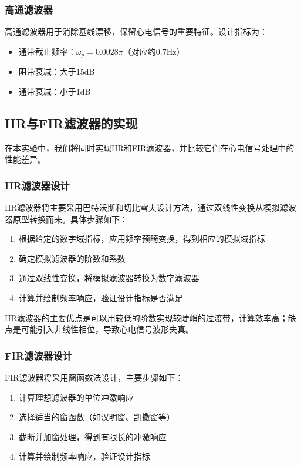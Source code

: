 \documentclass[12pt,hyperref,a4paper,UTF8]{ctexart}
\begin{document}
\subsubsection{高通滤波器}

高通滤波器用于消除基线漂移，保留心电信号的重要特征。设计指标为：
\begin{itemize}
    \item 通带截止频率：\(\omega_p = 0.0028\pi\)（对应约0.7Hz）
    \item 阻带衰减：大于15dB
    \item 通带衰减：小于1dB
\end{itemize}

\subsection{IIR与FIR滤波器的实现}

在本实验中，我们将同时实现IIR和FIR滤波器，并比较它们在心电信号处理中的性能差异。

\subsubsection{IIR滤波器设计}

IIR滤波器将主要采用巴特沃斯和切比雪夫设计方法，通过双线性变换从模拟滤波器原型转换而来。具体步骤如下：

\begin{enumerate}
    \item 根据给定的数字域指标，应用频率预畸变换，得到相应的模拟域指标
    \item 确定模拟滤波器的阶数和系数
    \item 通过双线性变换，将模拟滤波器转换为数字滤波器
    \item 计算并绘制频率响应，验证设计指标是否满足
\end{enumerate}

IIR滤波器的主要优点是可以用较低的阶数实现较陡峭的过渡带，计算效率高；缺点是可能引入非线性相位，导致心电信号波形失真。

\subsubsection{FIR滤波器设计}

FIR滤波器将采用窗函数法设计，主要步骤如下：

\begin{enumerate}
    \item 计算理想滤波器的单位冲激响应
    \item 选择适当的窗函数（如汉明窗、凯撒窗等）
    \item 截断并加窗处理，得到有限长的冲激响应
    \item 计算并绘制频率响应，验证设计指标
\end{enumerate}
\end{document}
